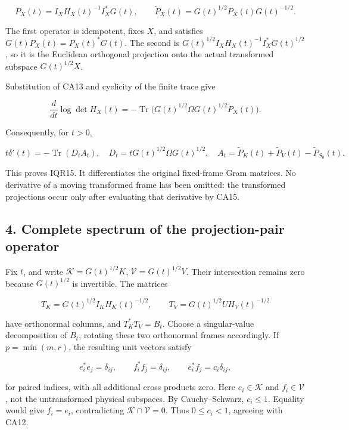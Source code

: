 \[
P_X(t)=I_XH_X(t)^{-1}I_X^*G(t),
\qquad
\widetilde P_X(t)=G(t)^{1/2}P_X(t)G(t)^{-1/2}.
\tag{CA14}
\]

The first operator is idempotent, fixes \(X\), and satisfies \(G(t)P_X(t)=P_X(t)^*G(t)\). The second is \(G(t)^{1/2}I_XH_X(t)^{-1}I_X^*G(t)^{1/2}\), so it is the Euclidean orthogonal projection onto the actual transformed subspace \(G(t)^{1/2}X\).

Substitution of CA13 and cyclicity of the finite trace give

\[
\frac{d}{dt}\log\det H_X(t)
=-\operatorname{Tr}\bigl(G(t)^{1/2}\Omega G(t)^{1/2}
\widetilde P_X(t)\bigr).
\tag{CA15}
\]

Consequently, for \(t>0\),

\[
t\delta'(t)=-\operatorname{Tr}(D_tA_t),
\quad D_t=tG(t)^{1/2}\Omega G(t)^{1/2},
\quad A_t=\widetilde P_K(t)+\widetilde P_V(t)-\widetilde P_{S_0}(t).
\tag{CA16}
\]

This proves IQR15. It differentiates the original fixed-frame Gram matrices. No derivative of a moving transformed frame has been omitted: the transformed projections occur only after evaluating that derivative by CA15.

\subsection{4. Complete spectrum of the projection-pair operator}\label{complete-spectrum-of-the-projection-pair-operator}

Fix \(t\), and write \(\mathcal K=G(t)^{1/2}K\), \(\mathcal V=G(t)^{1/2}V\). Their intersection remains zero because \(G(t)^{1/2}\) is invertible. The matrices

\[
T_K=G(t)^{1/2}I_KH_K(t)^{-1/2},
\qquad T_V=G(t)^{1/2}UH_V(t)^{-1/2}
\]

have orthonormal columns, and \(T_K^*T_V=B_t\). Choose a singular-value decomposition of \(B_t\), rotating these two orthonormal frames accordingly. If \(p=\min(m,r)\), the resulting unit vectors satisfy

\[
e_i^*e_j=\delta_{ij},\qquad f_i^*f_j=\delta_{ij},
\qquad e_i^*f_j=c_i\delta_{ij},
\tag{CA17}
\]

for paired indices, with all additional cross products zero. Here \(e_i\in\mathcal K\) and \(f_i\in\mathcal V\), not the untransformed physical subspaces. By Cauchy--Schwarz, \(c_i\le1\). Equality would give \(f_i=e_i\), contradicting \(\mathcal K\cap\mathcal V=0\). Thus \(0\le c_i<1\), agreeing with CA12.

